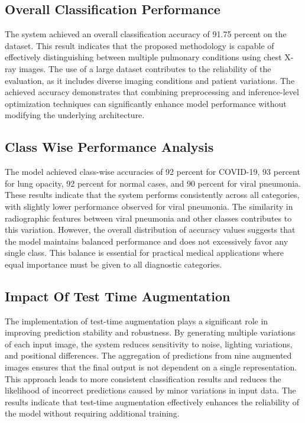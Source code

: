 \documentclass[a4paper,fleqn]{cas-dc}
\begin{document}
\subsection{Overall Classification Performance}
The system achieved an overall classification accuracy of 91.75 percent on the dataset. This result indicates that the proposed methodology is capable of effectively distinguishing between multiple pulmonary conditions using chest X-ray images. The use of a large dataset contributes to the reliability of the evaluation, as it includes diverse imaging conditions and patient variations. The achieved accuracy demonstrates that combining preprocessing and inference-level optimization techniques can significantly enhance model performance without modifying the underlying architecture.

\subsection{Class Wise Performance Analysis}
The model achieved class-wise accuracies of 92 percent for COVID-19, 93 percent for lung opacity, 92 percent for normal cases, and 90 percent for viral pneumonia. These results indicate that the system performs consistently across all categories, with slightly lower performance observed for viral pneumonia. The similarity in radiographic features between viral pneumonia and other classes contributes to this variation. However, the overall distribution of accuracy values suggests that the model maintains balanced performance and does not excessively favor any single class. This balance is essential for practical medical applications where equal importance must be given to all diagnostic categories.

\subsection{Impact Of Test Time Augmentation}
The implementation of test-time augmentation plays a significant role in improving prediction stability and robustness. By generating multiple variations of each input image, the system reduces sensitivity to noise, lighting variations, and positional differences. The aggregation of predictions from nine augmented images ensures that the final output is not dependent on a single representation. This approach leads to more consistent classification results and reduces the likelihood of incorrect predictions caused by minor variations in input data. The results indicate that test-time augmentation effectively enhances the reliability of the model without requiring additional training.
\end{document}

